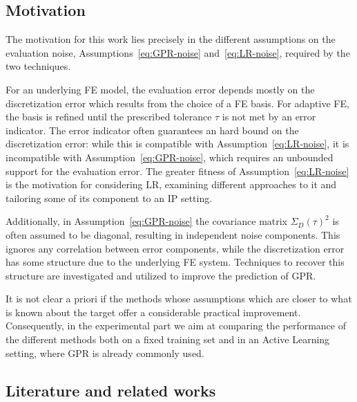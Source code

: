 \subsection{Motivation}\label{sec:motivation}
The motivation for this work lies precisely in the different assumptions on the evaluation noise, Assumptions~\ref{eq:GPR-noise} and~\ref{eq:LR-noise}, required by the two techniques.

For an underlying FE model, the evaluation error depends mostly on the discretization error which results from the choice of a FE basis.
For adaptive FE, the basis is refined until the prescribed tolerance $\tau$ is not met by an error indicator.
The error indicator often guarantees an hard bound on the discretization error: while this is compatible with Assumption~\ref{eq:LR-noise}, it is incompatible with Assumption~\ref{eq:GPR-noise}, which requires an unbounded support for the evaluation error. 
The greater fitness of Assumption~\ref{eq:LR-noise} is the motivation for considering LR, examining different approaches to it and tailoring some of its component to an IP setting.

Additionally, in Assumption~\ref{eq:GPR-noise} the covariance matrix $\Sigma_D(\tau)^2$ is often assumed to be diagonal, resulting in independent noise components. 
This ignores any correlation between error components, while the discretization error has some structure due to the underlying FE system.
Techniques to recover this structure are investigated and utilized to improve the prediction of GPR.

It is not clear a priori if the methods whose assumptions which are closer to what is known about the target offer a considerable practical improvement.
Consequently, in the experimental part we aim at comparing the performance of the different methods both on a fixed training set and in an Active Learning setting, where GPR is already commonly used. 


\subsection{Literature and related works}\label{sec:literature}
